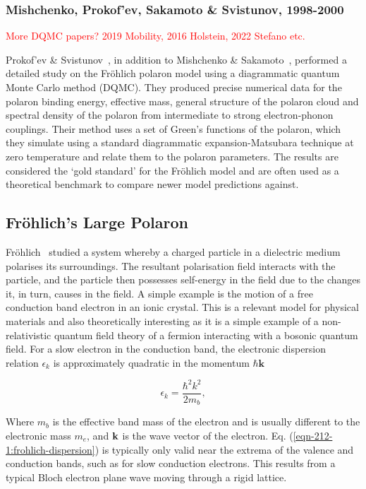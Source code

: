 \subsubsection{Mishchenko, Prokof’ev, Sakamoto \& Svistunov, 1998-2000}
\label{subsubsec:2-1-1-9}

\textcolor{red}{More DQMC papers? 2019 Mobility, 2016 Holstein, 2022 Stefano etc.}

Prokof’ev \& Svistunov~\cite{prokofev_polaron_1998}, in addition to Mishchenko \& Sakamoto~\cite{mishchenko_diagrammatic_2000}, performed a detailed study on the Fr\"ohlich polaron model using a diagrammatic quantum Monte Carlo method (DQMC). They produced precise numerical data for the polaron binding energy, effective mass, general structure of the polaron cloud and spectral density of the polaron from intermediate to strong electron-phonon couplings. Their method uses a set of Green's functions of the polaron, which they simulate using a standard diagrammatic expansion-Matsubara technique at zero temperature and relate them to the polaron parameters. The results are considered the `gold standard' for the Fr\"ohlich model and are often used as a theoretical benchmark to compare newer model predictions against.

\subsection{Fr\"ohlich's Large Polaron}
\label{subsec:2-1-2}

Fr\"ohlich~\cite{frohlich_electrons_1954} studied a system whereby a charged particle in a dielectric medium polarises its surroundings. The resultant polarisation field interacts with the particle, and the particle then possesses self-energy in the field due to the changes it, in turn, causes in the field. A simple example is the motion of a free conduction band electron in an ionic crystal. This is a relevant model for physical materials and also theoretically interesting as it is a simple example of a non-relativistic quantum field theory of a fermion interacting with a bosonic quantum field. For a slow electron in the conduction band, the electronic dispersion relation $\epsilon_k$ is approximately quadratic in the momentum $\hbar \textbf{k}$ 

\begin{equation}
    \epsilon_k = \frac{\hbar^2 k^2}{2 m_b},
\label{eqn-212-1:frohlich-dispersion}
\end{equation}

Where $m_b$ is the effective band mass of the electron and is usually different to the electronic mass $m_e$, and $\vb{k}$ is the wave vector of the electron. Eq. (\ref{eqn-212-1:frohlich-dispersion}) is typically only valid near the extrema of the valence and conduction bands, such as for slow conduction electrons. This results from a typical Bloch electron plane wave moving through a rigid lattice.  

